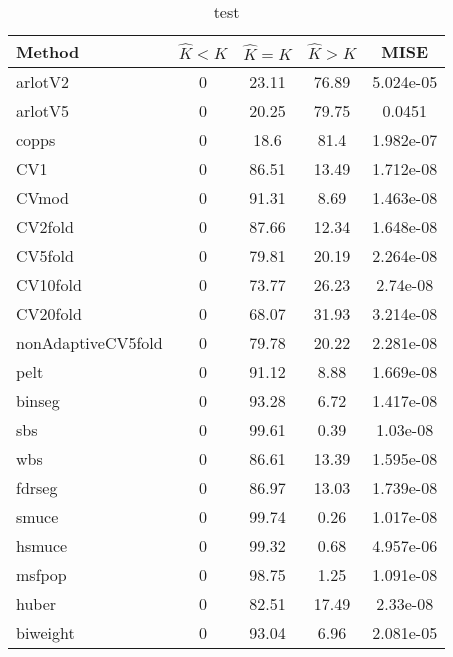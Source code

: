 \begin{table}[ht]
\centering
\begin{tabular}{l|cccc}
  \hline
Method & $\hat{K} < K$ & $\hat{K} = K$ & $\hat{K} > K$ & MISE \\ 
  \hline
arlotV2 &     0 & 23.11 & 76.89 & 5.024e-05 \\ 
  arlotV5 &     0 & 20.25 & 79.75 & 0.0451 \\ 
  copps &     0 &  18.6 &  81.4 & 1.982e-07 \\ 
  CV1 &     0 & 86.51 & 13.49 & 1.712e-08 \\ 
  CVmod &     0 & 91.31 &  8.69 & 1.463e-08 \\ 
  CV2fold &     0 & 87.66 & 12.34 & 1.648e-08 \\ 
  CV5fold &     0 & 79.81 & 20.19 & 2.264e-08 \\ 
  CV10fold &     0 & 73.77 & 26.23 & 2.74e-08 \\ 
  CV20fold &     0 & 68.07 & 31.93 & 3.214e-08 \\ 
  nonAdaptiveCV5fold &     0 & 79.78 & 20.22 & 2.281e-08 \\ 
  pelt &     0 & 91.12 &  8.88 & 1.669e-08 \\ 
  binseg &     0 & 93.28 &  6.72 & 1.417e-08 \\ 
  sbs &     0 & 99.61 &  0.39 & 1.03e-08 \\ 
  wbs &     0 & 86.61 & 13.39 & 1.595e-08 \\ 
  fdrseg &     0 & 86.97 & 13.03 & 1.739e-08 \\ 
  smuce &     0 & 99.74 &  0.26 & 1.017e-08 \\ 
  hsmuce &     0 & 99.32 &  0.68 & 4.957e-06 \\ 
  msfpop &     0 & 98.75 &  1.25 & 1.091e-08 \\ 
  huber &     0 & 82.51 & 17.49 & 2.33e-08 \\ 
  biweight &     0 & 93.04 &  6.96 & 2.081e-05 \\ 
   \hline
\end{tabular}
\caption{test} 
\end{table}
